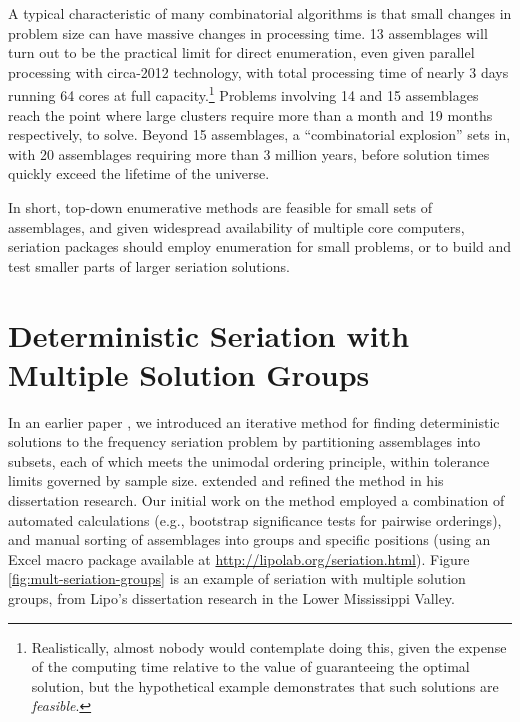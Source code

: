 
A typical characteristic of many combinatorial algorithms is that small changes in problem size can have massive changes in processing time.  13 assemblages will turn out to be the practical limit for direct enumeration, even given parallel processing with circa-2012 technology, with total processing time of nearly 3 days running 64 cores at full capacity.\footnote{Realistically, almost nobody would contemplate doing this, given the expense of the computing time relative to the value of guaranteeing the optimal solution, but the hypothetical example demonstrates that such solutions are \emph{feasible}.}  Problems involving 14 and 15 assemblages reach the point where large clusters require more than a month and 19 months respectively, to solve.  Beyond 15 assemblages, a ``combinatorial explosion'' sets in, with 20 assemblages requiring more than 3 million years, before solution times quickly exceed the lifetime of the universe.  

In short, top-down enumerative methods are feasible for small sets of assemblages, and given widespread availability of multiple core computers, seriation packages should employ enumeration for small problems, or to build and test smaller parts of larger seriation solutions.  

\section{Deterministic Seriation with Multiple Solution Groups}
\label{sec:seriation-groups}



In an earlier paper \citep{Lipo1997}, we introduced an iterative method for finding deterministic solutions to the frequency seriation problem by partitioning assemblages into subsets, each of which meets the unimodal ordering principle, within tolerance limits governed by sample size.  \citet{Lipo2001} extended and refined the method in his dissertation research.  Our initial work on the method employed a combination of automated calculations (e.g., bootstrap significance tests for pairwise orderings), and manual sorting of assemblages into groups and specific positions (using an Excel macro package available at \url{http://lipolab.org/seriation.html}).  Figure \ref{fig:mult-seriation-groups} is an example of seriation with multiple solution groups, from Lipo's dissertation research in the Lower Mississippi Valley.  

